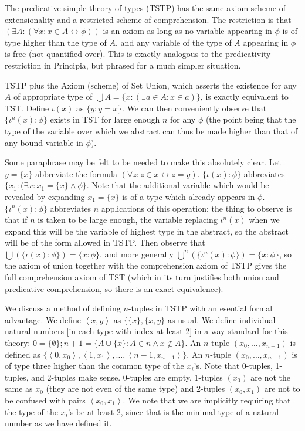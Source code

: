 \documentclass[12pt]{article}
\begin{document}
The predicative simple theory of types (TSTP) has the same axiom scheme of extensionality and a restricted scheme of comprehension.  The restriction is that $(\exists A:(\forall x:x\in A\leftrightarrow \phi))$ is an axiom as long as no variable
appearing in $\phi$ is of type higher than the type of $A$, and any variable of the type of $A$ appearing in $\phi$ is free (not quantified over).   This is exactly analogous to the predicativity restriction in Principia, but phrased for a much simpler situation.

TSTP plus the Axiom (scheme) of Set Union, which asserts the existence for any $A$ of appropriate type of $\bigcup A = \{x:(\exists a \in A:x \in a)\}$, is exactly equivalent to TST.  Define $\iota(x)$ as $\{y:y=x\}$.  We can then conveniently
observe that $\{\iota^n(x):\phi\}$ exists in TST for large enough $n$ for any $\phi$ (the point being that the type of the variable over which we abstract can thus be made higher than that of any bound variable in $\phi$).

Some paraphrase may be felt to be needed to make this absolutely clear.  Let $y=\{x\}$ abbreviate the formula
$(\forall z:z\in x \leftrightarrow z=y)$.  $\{\iota(x):\phi\}$ abbreviates $\{x_1:(\exists x:x_1 = \{x\} \wedge \phi\}$.  Note that the additional variable which would be revealed by expanding $x_1 = \{x\}$ is of a type which already appears in $\phi$.
$\{\iota^n(x):\phi\}$ abbreviates $n$ applications of this operation:  the thing to observe is that if $n$ is taken to be large enough, the variable replacing $\iota^n(x)$ when we expand this will be the variable of highest type in the abstract, so the abstract will be of the form allowed in TSTP.  Then observe that $\bigcup(\{\iota(x):\phi\}) = \{x:\phi\}$, and more generally
$\bigcup^n(\{\iota^n(x):\phi\}) = \{x:\phi\}$, so the axiom of union together with the comprehension axiom of TSTP
gives the full comprehension axiom of TST (which in its turn justifies both union and predicative comprehension, so there is an exact equivalence).

We discuss a method of defining $n$-tuples in TSTP with an esential formal advantage.  We define $\left<x,y\right>$ as
$\{\{x\},\{x,y\}$ as usual.  We define individual natural numbers [in each type with index at least 2]  in a way standard for this theory:  $0 = \{\emptyset\}; n+1 = \{A \cup \{x\}:A \in n \wedge x \not\in A\}$.  An $n$-tuple $(x_0,\ldots,x_{n-1})$ is defined as $\{\left<0,x_0\right>,\left<1,x_1\right>,\ldots,\left<{n-1},x_{n-1}\right>\}$.  An $n$-tuple $(x_0,\ldots,x_{n-1})$ is of type three higher than the common type of the $x_i$'s.  Note that 0-tuples, 1-tuples, and 2-tuples make sense.  0-tuples are empty, 1-tuples $(x_0)$ are not the same as $x_0$ (they are not even of the same type) and 2-tuples $(x_0,x_1)$ are not to be confused with pairs $\left<x_0,x_1\right>$.  We note that we are implicitly requiring that the type of the $x_i$'s be at least 2, since that is the minimal type of a natural number as we have defined it.
\end{document}
